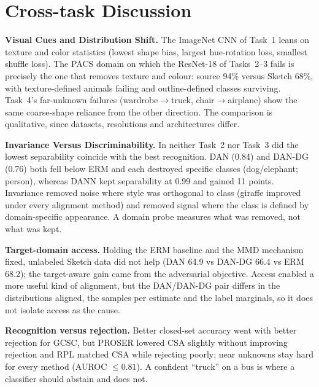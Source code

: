\documentclass{article}
\begin{document}
\section{Cross-task Discussion}
\textbf{Visual Cues and Distribution Shift.} The ImageNet CNN of Task~1 leans on texture and color statistics (lowest shape bias, largest hue-rotation loss, smallest shuffle loss). The PACS domain on which the ResNet-18 of Tasks~2--3 fails is precisely the one that removes texture and colour: source 94\% versus Sketch 68\%, with texture-defined animals failing and outline-defined classes surviving. Task~4's far-unknown failures (wardrobe$\to$truck, chair$\to$airplane) show the same coarse-shape reliance from the other direction. The comparison is qualitative, since datasets, resolutions and architectures differ.

\textbf{Invariance Versus Discriminability.} In neither Task~2 nor Task~3 did the lowest separability coincide with the best recognition. DAN (0.84) and DAN-DG (0.76) both fell below ERM and each destroyed specific classes (dog/elephant; person), whereas DANN kept separability at 0.99 and gained 11 points. Invariance removed noise where style was orthogonal to class (giraffe improved under every alignment method) and removed signal where the class is defined by
domain-specific appearance. A domain probe measures what was removed, not what was kept.

\textbf{Target-domain access.} Holding the ERM baseline and the MMD mechanism fixed, unlabeled Sketch data did not help (DAN 64.9 vs DAN-DG 66.4 vs ERM 68.2); the target-aware gain came from the adversarial objective. Access enabled a more useful kind of alignment, but the DAN/DAN-DG pair differs in the distributions aligned, the samples per estimate and the
label marginals, so it does not isolate access as the cause.

\textbf{Recognition versus rejection.} Better closed-set accuracy went with better rejection for GCSC, but PROSER lowered CSA slightly without improving rejection and RPL matched CSA while rejecting poorly; near unknowns stay hard for every method (AUROC $\le0.81$). A confident ``truck'' on a bus is where a classifier should abstain and does not.
\end{document}
